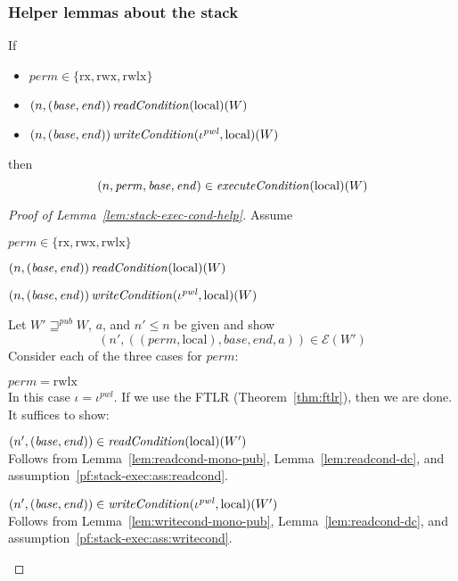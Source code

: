 \documentclass[a4paper]{article}
\newcommand{\var}[1]{\mathit{#1}}
\newcommand{\addr}{\var{a}}
\newcommand{\start}{\var{base}}
\newcommand{\addrend}{\var{end}}
\newcommand{\perm}{\var{perm}}
\newcommand{\pwl}{\var{pwl}}
\newcommand{\plainfun}[2]{
  \ifthenelse{\equal{#2}{}}
  {\mathit{#1}}
  {\mathit{#1}(#2)}
}
\newcommand{\readCond}[1]{\plainfun{readCondition}{#1}}
\newcommand{\writeCond}[1]{\plainfun{writeCondition}{#1}}
\newcommand{\execCond}[1]{\plainfun{executeCondition}{#1}}
\newcommand{\futurewk}{\mathbin{\sqsupseteq}^{\var{pub}}}
\newcommand{\asmType}{\plaindom{AsmType}}
\newcommand{\plaindom}[1]{\mathrm{#1}}
\newcommand{\intr}[2]{\mathcal{#1}}
\newcommand{\exprintr}[1]{\intr{E}{#1}}
\newcommand{\stder}{\exprintr{\asmType}}
\newcommand{\npair}[2][n]{\left(#1,#2 \right)}
\newcommand{\plainperm}[1]{\mathrm{#1}}
\newcommand{\exec}{\plainperm{rx}}
\newcommand{\rwx}{\plainperm{rwx}}
\newcommand{\rwlx}{\plainperm{rwlx}}
\newcommand{\local}{\plainperm{local}}
\begin{document}
\subsubsection{Helper lemmas about the stack}
\begin{lemma}
  \label{lem:stack-exec-cond-help}
  If
  \begin{itemize}
  \item $\perm \in \{\exec,\rwx,\rwlx \}$
  \item $\npair{(\start,\addrend)} \readCond{}(\local)(W)$
  \item $\npair{(\start,\addrend)} \writeCond{}(\iota^\pwl,\local)(W)$
  \end{itemize}
  then
  \[
    \npair[n]{\perm,\start,\addrend} \in \execCond{}(\local)(W)
  \]
\end{lemma}
\begin{proof}[Proof of Lemma~\ref{lem:stack-exec-cond-help}]
Assume
\begin{enumproof}
\item $\perm \in \{\exec,\rwx,\rwlx \}$
\item $\npair{(\start,\addrend)} \readCond{}(\local)(W)$ \label{pf:stack-exec:ass:readcond}
\item $\npair{(\start,\addrend)} \writeCond{}(\iota^\pwl,\local)(W)$ \label{pf:stack-exec:ass:writecond}
\end{enumproof}
Let $W' \futurewk W$, $\addr$, and $n' \leq n$ be given and show
\[
  \npair[n']{((\perm,\local),\start,\addrend,\addr)} \in \stder(W')
\]
Consider each of the three cases for $\perm$:
\begin{enumproof}[resume]
  \item $\perm = \rwlx$\\
    In this case $\iota= \iota^\pwl$. If we use the FTLR (Theorem~\ref{thm:ftlr}), then we are done. It suffices to show:
    \begin{enumproof}
      \item $\npair[n']{(\start,\addrend)} \in \readCond{}(\local)(W')$ \\
        Follows from Lemma~\ref{lem:readcond-mono-pub}, Lemma~\ref{lem:readcond-dc}, and assumption~\ref{pf:stack-exec:ass:readcond}.
      \item $\npair[n']{(\start,\addrend)} \in \writeCond{}(\iota^\pwl,\local)(W')$\\
        Follows from Lemma~\ref{lem:writecond-mono-pub}, Lemma~\ref{lem:readcond-dc}, and assumption~\ref{pf:stack-exec:ass:writecond}.
    \end{enumproof}

\end{enumproof}
\end{proof}
\end{document}
